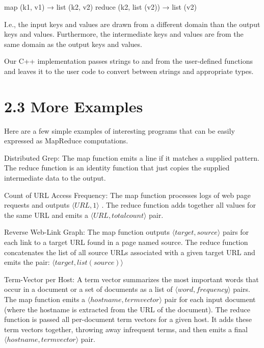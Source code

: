 \documentclass[
]{article}
\newenvironment{Shaded}{}{}
\newcommand{\NormalTok}[1]{#1}
\begin{document}
\begin{Shaded}
\begin{Highlighting}[]
\NormalTok{map (k1, v1) → list (k2, v2)}
\NormalTok{reduce (k2, list (v2)) → list (v2) }
\end{Highlighting}
\end{Shaded}

I.e., the input keys and values are drawn from a different domain than
the output keys and values. Furthermore, the intermediate keys and
values are from the same domain as the output keys and values.

Our C++ implementation passes strings to and from the user-defined
functions and leaves it to the user code to convert between strings and
appropriate types.

\section{2.3 More Examples}\label{more-examples}

Here are a few simple examples of interesting programs that can be
easily expressed as MapReduce computations.

Distributed Grep: The map function emits a line if it matches a supplied
pattern. The reduce function is an identity function that just copies
the supplied intermediate data to the output.

Count of URL Access Frequency: The map function processes logs of web
page requests and outputs \(\langle URL, 1 \rangle\) . The reduce
function adds together all values for the same URL and emits a
\(\langle URL, total count \rangle\) pair.

Reverse Web-Link Graph: The map function outputs
\(\langle target, source \rangle\) pairs for each link to a target URL
found in a page named source. The reduce function concatenates the list
of all source URLs associated with a given target URL and emits the
pair: \(\langle target, list(source) \rangle\)

Term-Vector per Host: A term vector summarizes the most important words
that occur in a document or a set of documents as a list of
\(\langle word, frequency \rangle\) pairs. The map function emits a
\(\langle hostname, term vector \rangle\) pair for each input document
(where the hostname is extracted from the URL of the document). The
reduce function is passed all per-document term vectors for a given
host. It adds these term vectors together, throwing away infrequent
terms, and then emits a final \(\langle hostname, term vector \rangle\)
pair.
\end{document}
